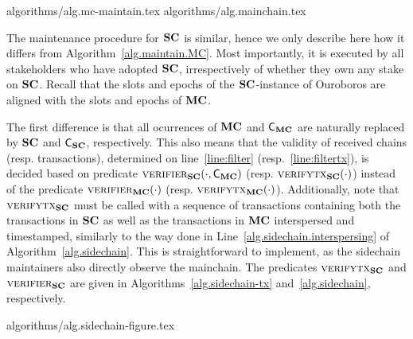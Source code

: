 {algorithms/alg.mc-maintain.tex}
{algorithms/alg.mainchain.tex}

The maintenance procedure for $\mathbf{SC}$ is similar, hence we only
describe here how it differs from Algorithm~\ref{alg.maintain.MC}. Most
importantly, it is executed by all stakeholders who have adopted $\mathbf{SC}$,
irrespectively of whether they own any stake on $\mathbf{SC}$.
Recall that the slots and epochs of the $\mathbf{SC}$-instance of Ouroboros are aligned
with the slots and epochs of $\mathbf{MC}$.

The first difference is that all ocurrences of $\mathbf{MC}$ and $\mathsf{C_{\mathbf{MC}}}$ are
naturally replaced by $\mathbf{SC}$ and $\mathsf{C_{\mathbf{SC}}}$, respectively.  This also means that
the validity of received chains (resp. transactions), determined on
line~\ref{line:filter} (resp.~\ref{line:filtertx}), is decided based on
predicate
$\textsc{verifier}_{\mathbf{SC}}(\cdot,\mathsf{C_{\mathbf{MC}}})$ (resp.
$\textsc{verifytx}_{\mathbf{SC}}(\cdot)$)
instead of
the predicate
$\textsc{verifier}_{\mathbf{MC}}(\cdot)$ (resp.
$\textsc{verifytx}_{\mathbf{MC}}(\cdot)$). Additionally, note that $\textsc{verifytx}_{\mathbf{SC}}$ must be called
with a sequence of transactions containing both the transactions in $\mathbf{SC}$ as
well as the transactions in $\mathbf{MC}$ interspersed and timestamped, similarly to the
way done in Line~\ref{alg.sidechain.interspersing} of
Algorithm~\ref{alg.sidechain}. This is straightforward to implement, as the
sidechain maintainers also directly observe the mainchain. The predicates
$\textsc{verifytx}_{\mathbf{SC}}$
and
$\textsc{verifier}_{\mathbf{SC}}$
are given in
Algorithms~\ref{alg.sidechain-tx}
and~\ref{alg.sidechain}, respectively.

{algorithms/alg.sidechain-figure.tex}

